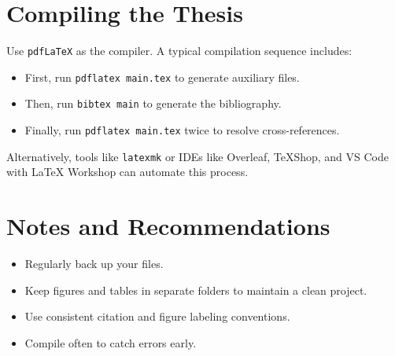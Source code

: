 \section{Compiling the Thesis}
\begin{paragraph}
Use \texttt{pdfLaTeX} as the compiler. A typical compilation sequence includes:
\begin{itemize}[leftmargin=\paritemindent]
    \item First, run \texttt{pdflatex main.tex} to generate auxiliary files.
    \item Then, run \texttt{bibtex main} to generate the bibliography.
    \item Finally, run \texttt{pdflatex main.tex} twice to resolve cross-references.
\end{itemize}

Alternatively, tools like \texttt{latexmk} or IDEs like Overleaf, TeXShop, and VS Code with {\LaTeX} Workshop can automate this process.
\end{paragraph}

\section{Notes and Recommendations}
\begin{paragraph}
\begin{itemize}[leftmargin=\paritemindent]
    \item Regularly back up your files.
    \item Keep figures and tables in separate folders to maintain a clean project.
    \item Use consistent citation and figure labeling conventions.
    \item Compile often to catch errors early.
\end{itemize}
\end{paragraph}
